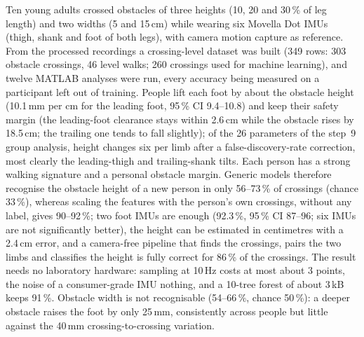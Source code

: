 Ten young adults crossed obstacles of three heights (10, 20 and 30\,\% of leg length) and two widths (5 and 15\,cm) while wearing
six Movella Dot IMUs (thigh, shank and foot of both legs), with camera motion capture as reference. From the processed recordings
a crossing-level dataset was built (349 rows: 303 obstacle crossings, 46 level walks; 260 crossings used for machine learning), and
twelve MATLAB analyses were run, every accuracy being measured on a participant left out of training. People lift each foot by about
the obstacle height (10.1\,mm per cm for the leading foot, 95\,\% CI 9.4--10.8) and keep their safety margin (the leading-foot clearance stays within 2.6\,cm while the obstacle rises by 18.5\,cm; the trailing
one tends to fall slightly); of the 26 parameters of the step~9 group analysis, height changes six per limb after a false-discovery-rate
correction, most clearly the leading-thigh and trailing-shank tilts. Each person
has a strong walking signature and a personal obstacle margin. Generic models therefore recognise the obstacle height of a new
person in only 56--73\,\% of crossings (chance 33\,\%), whereas scaling the features with the person's own crossings, without any
label, gives 90--92\,\%; two foot IMUs are enough (92.3\,\%, 95\,\% CI 87--96; six IMUs are not significantly better), the
height can be estimated in centimetres with a 2.4\,cm error, and a camera-free pipeline that finds the crossings, pairs the two
limbs and classifies the height is fully correct for 86\,\% of the crossings. The result needs no laboratory hardware: sampling at
10\,Hz costs at most about 3 points, the noise of a consumer-grade IMU nothing, and a 10-tree forest of about 3\,kB keeps 91\,\%.
Obstacle width is not recognisable (54--66\,\%, chance 50\,\%): a deeper obstacle raises the foot by only 25\,mm, consistently
across people but little against the 40\,mm crossing-to-crossing variation. 
